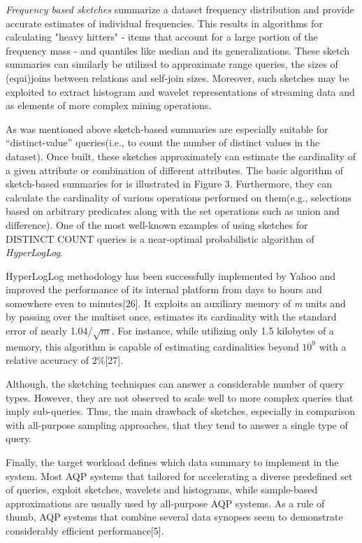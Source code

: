 \documentclass[10pt, conference, compsocconf]{IEEEtran}
\begin{document}
\textit{Frequency based sketches} summarize a dataset frequency distribution and provide accurate estimates of individual frequencies. This results in algorithms for calculating "heavy hitters" - items that account for a large portion of the frequency mass - and quantiles like median and its generalizations. These sketch summaries can similarly be utilized to approximate range queries, the sizes of (equi)joins between relations and self-join sizes. Moreover, such sketches may be exploited to extract histogram and wavelet representations of streaming data and as elements of more complex mining operations.

As was mentioned above sketch-based summaries are especially suitable for “distinct-value” queries(i.e., to count the number of distinct values in the dataset). Once built, these sketches approximately can estimate the cardinality of a given attribute or combination of different attributes. The basic algorithm of sketch-based summaries for is illustrated in Figure 3. Furthermore, they can calculate the cardinality of various operations performed on them(e.g., selections based on arbitrary predicates along with the set operations such as union and difference). One of the most well-known examples of using sketches for DISTINCT COUNT queries is a near-optimal probabilistic algorithm of \textit{HyperLogLog}. 

HyperLogLog methodology has been successfully implemented by Yahoo and improved the performance of its internal platform from days to hours and somewhere even to minutes[26]. It exploits an auxiliary memory of \textit{m} units and by passing over the multiset once, estimates its cardinality with the standard error of nearly 1.04/$\sqrt{\textit{m}}$. For instance, while utilizing only 1.5 kilobytes of a memory, this algorithm is capable of estimating cardinalities beyond $10^9$ with a relative accuracy of 2\%[27].

Although, the sketching techniques can answer a considerable number of query types. However, they are not observed to scale well to more complex queries that imply sub-queries. Thus, the main drawback of sketches, especially in comparison with all-purpose sampling approaches, that they tend to answer a single type of query. 

Finally, the target workload defines which data summary to implement in the system. Most AQP systems that tailored for accelerating a diverse predefined set of queries, exploit sketches, wavelets and histograms, while sample-based approximations are usually used by all-purpose AQP systems. As a rule of thumb, AQP systems that combine several data synopses seem to demonstrate considerably efficient performance[5]. 
\end{document}
